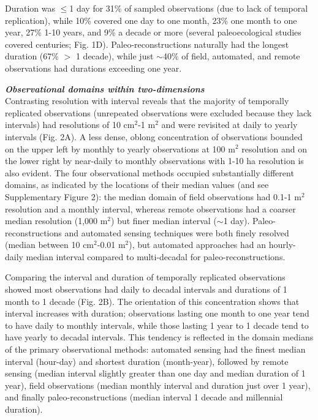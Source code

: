 \documentclass[12pt]{article}
\begin{document}
Duration was $\leq$1 day for 31\% of sampled observations (due to lack of temporal replication), while 10\% covered one day to one month, 23\% one month to one year, 27\% 1-10 years, and 9\% a decade or more (several paleoecological studies covered centuries; Fig. 1D). Paleo-reconstructions naturally had the longest duration (67\% $>$ 1 decade), while just $\sim$40\% of field, automated, and remote observations had durations exceeding one year.

\vspace{5pt}
\noindent \textbf{\emph{Observational domains within two-dimensions}}\\
Contrasting resolution with interval reveals that the majority of temporally replicated observations (unrepeated observations were excluded because they lack intervals) had resolutions of 10 cm$^2$-1 m$^2$ and were revisited at daily to yearly intervals (Fig. 2A). A less dense, oblong concentration of observations bounded on the upper left by monthly to yearly observations at 100 m$^2$ resolution and on the lower right by near-daily to monthly observations with 1-10 ha resolution is also evident. The four observational methods occupied substantially different domains, as indicated by the locations of their median values (and see Supplementary Figure 2): the median domain of field observations had 0.1-1 m$^2$ resolution and a monthly interval, whereas remote observations had a coarser median resolution (1,000 m$^2$) but finer median interval ($\sim$1 day). Paleo-reconstructions and automated sensing techniques were both finely resolved (median between 10 cm$^2$-0.01 m$^2$), but automated approaches had an hourly-daily median interval compared to multi-decadal for paleo-reconstructions. 

Comparing the interval and duration of temporally replicated observations showed most observations had daily to decadal intervals and durations of 1 month to 1 decade (Fig. 2B). The orientation of this concentration shows that interval increases with duration; observations lasting one month to one year tend to have daily to monthly intervals, while those lasting 1 year to 1 decade tend to have yearly to decadal intervals. This tendency is reflected in the domain medians of the primary observational methods: automated sensing had the finest median interval (hour-day) and shortest duration (month-year), followed by remote sensing (median interval slightly greater than one day and median duration of 1 year), field observations (median monthly interval and duration just over 1 year), and finally paleo-reconstructions (median interval 1 decade and millennial duration). 
\end{document}
